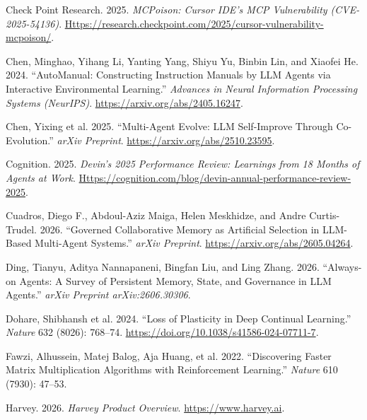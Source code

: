 \documentclass[
]{article}
\newlength{\cslhangindent}
\newenvironment{CSLReferences}[2] %
 {\begin{list}{}{%
  \setlength{\itemindent}{0pt}
  \setlength{\leftmargin}{0pt}
  \setlength{\parsep}{0pt}
  \ifodd #1
   \setlength{\leftmargin}{\cslhangindent}
   \setlength{\itemindent}{-1\cslhangindent}
  \fi
  \setlength{\itemsep}{#2\baselineskip}}}
 {\end{list}}
\begin{document}
\begin{CSLReferences}{1}{1}
Check Point Research. 2025. \emph{{MCPoison}: Cursor {IDE}'s {MCP}
Vulnerability ({CVE}-2025-54136)}.
\href{https://research.checkpoint.com/2025/cursor-vulnerability-mcpoison/}{Https://research.checkpoint.com/2025/cursor-vulnerability-mcpoison/}.

Chen, Minghao, Yihang Li, Yanting Yang, Shiyu Yu, Binbin Lin, and
Xiaofei He. 2024. {``{AutoManual}: Constructing Instruction Manuals by
{LLM} Agents via Interactive Environmental Learning.''} \emph{Advances
in Neural Information Processing Systems (NeurIPS)}.
\url{https://arxiv.org/abs/2405.16247}.

{Chen, Yixing et al.} 2025. {``Multi-Agent Evolve: {LLM} Self-Improve
Through Co-Evolution.''} \emph{arXiv Preprint}.
\url{https://arxiv.org/abs/2510.23595}.

Cognition. 2025. \emph{Devin's 2025 Performance Review: Learnings from
18 Months of Agents at Work}.
\href{https://cognition.com/blog/devin-annual-performance-review-2025}{Https://cognition.com/blog/devin-annual-performance-review-2025}.

Cuadros, Diego F., Abdoul-Aziz Maiga, Helen Meskhidze, and Andre
Curtis-Trudel. 2026. {``Governed Collaborative Memory as Artificial
Selection in {LLM}-Based Multi-Agent Systems.''} \emph{arXiv Preprint}.
\url{https://arxiv.org/abs/2605.04264}.

Ding, Tianyu, Aditya Nannapaneni, Bingfan Liu, and Ling Zhang. 2026.
{``Always-on Agents: A Survey of Persistent Memory, State, and
Governance in {LLM} Agents.''} \emph{arXiv Preprint arXiv:2606.30306}.

{Dohare, Shibhansh et al.} 2024. {``Loss of Plasticity in Deep Continual
Learning.''} \emph{Nature} 632 (8026): 768--74.
\url{https://doi.org/10.1038/s41586-024-07711-7}.

{Fawzi, Alhussein, Matej Balog, Aja Huang, et al.} 2022. {``Discovering
Faster Matrix Multiplication Algorithms with Reinforcement Learning.''}
\emph{Nature} 610 (7930): 47--53.

Harvey. 2026. \emph{Harvey Product Overview}.
\url{https://www.harvey.ai}.


\end{CSLReferences}
\end{document}
